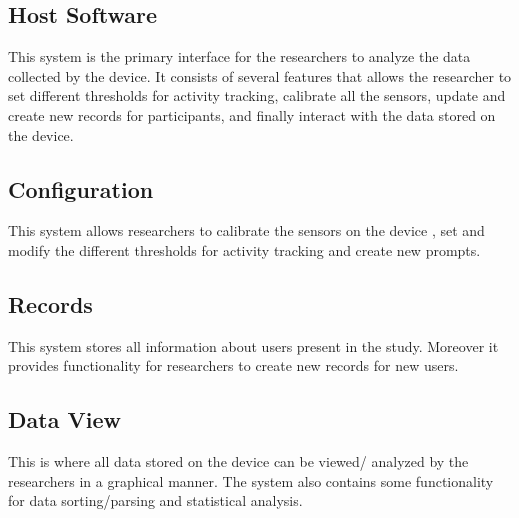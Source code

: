 \documentclass{article}
\begin{document}
\subsection{\label{HostSfwr_sec}Host Software}
This system is the primary interface for the researchers to analyze the data collected by the device. It consists of several features that allows the researcher to set different
thresholds for activity tracking, calibrate all the sensors, update and create new records for participants, and finally interact with the data stored on the device.

\subsection{\label{Configuration_sec}Configuration}
This system allows researchers to calibrate the sensors on the device , set and modify the different thresholds for activity tracking and create new prompts.

\subsection{\label{Records_sec}Records}
This system stores all information about users present in the study. Moreover it provides functionality for researchers to create new records for new users.

\subsection{\label{View_sec}Data View}
This is where all data stored on the device can be viewed/ analyzed by the researchers in a graphical manner. The system also contains some functionality for data sorting/parsing and statistical analysis.
\end{document}
